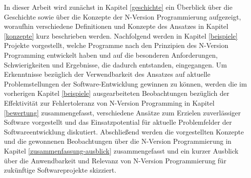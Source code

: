 In dieser Arbeit wird zunächst in Kapitel \ref{geschichte} ein Überblick über die Geschichte sowie über die Konzepte der N-Version Programmierung aufgezeigt, woraufhin verschiedene Definitionen und Konzepte des Ansatzes in Kapitel \ref{konzepte} kurz beschrieben werden. Nachfolgend werden in Kapitel \ref{beispiele} Projekte vorgestellt, welche Programme nach den Prinzipien des N-Version Programming entwickelt haben und auf die besonderen Anforderungen, Schwierigkeiten und Ergebnisse, die dadurch entstanden, eingegangen.
Um Erkenntnisse bezüglich der Verwendbarkeit des Ansatzes auf aktuelle Problemstellungen der Software-Entwicklung gewinnen zu können, werden die im vorherigen Kapitel \ref{beispiele} ausgearbeiteten Beobachtungen bezüglich der Effektivität zur Fehlertoleranz von N-Version Programming in Kapitel \ref{bewertung} zusammengefasst, verschiedene Ansätze zum Erzielen zuverlässiger Software vorgestellt und das Einsatzpotential für aktuelle Problemfelder der Softwareentwicklung diskutiert.
Abschließend werden die vorgestellten Konzepte und die gewonnenen Beobachtungen über die N-Version Programmierung in Kapitel \ref{zusammenfassung-ausblick} zusammengefasst und ein kurzer Ausblick über die Anwendbarkeit und Relevanz von N-Version Programmierung für zukünftige Softwareprojekte skizziert.